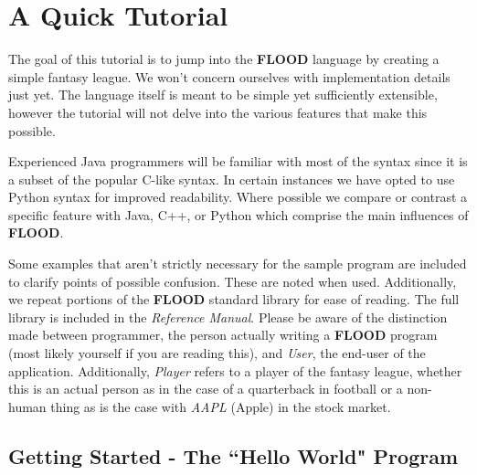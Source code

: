 \documentclass[12pt]{report}
\begin{document}
\chapter{A Quick Tutorial}

\begin{doublespace}
The goal of this tutorial is to jump into the \textbf{FLOOD} language by creating a simple fantasy league. We won't concern ourselves with implementation details just yet. The language itself is meant to be simple yet sufficiently extensible, however the tutorial will not delve into the various features that make this possible. 

Experienced Java programmers will be familiar with most of the syntax since it is a subset of the popular C-like syntax. In certain instances we have opted to use Python syntax for improved readability. Where possible we compare or contrast a specific feature with Java, C++, or Python which comprise the main influences of \textbf{FLOOD}. 

Some examples that aren't strictly necessary for the sample program are included to clarify points of possible confusion. These are noted when used. Additionally, we repeat portions of the \textbf{FLOOD} standard library for ease of reading. The full library is included in the \textit{Reference Manual}. Please be aware of the distinction made between programmer, the person actually writing a \textbf{FLOOD} program (most likely yourself if you are reading this), and \textit{User}, the end-user of the application. Additionally, \textit{Player} refers to a player of the fantasy league, whether this is an actual person as in the case of a quarterback in football or a non-human thing as is the case with \textit{AAPL} (Apple) in the stock market.
\end{doublespace}

\section{Getting Started - The ``Hello World" Program}
\end{document}
